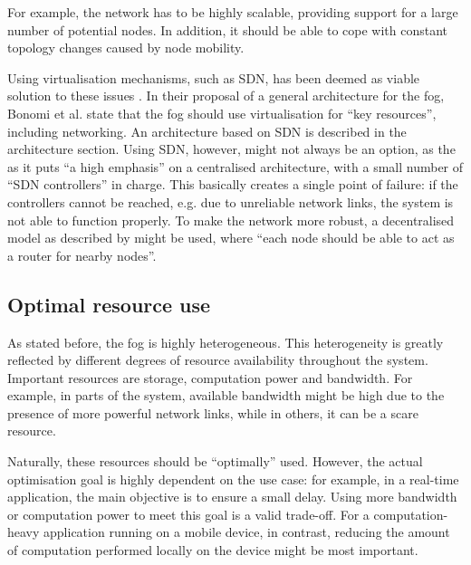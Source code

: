 \documentclass{article}
\begin{document}
For example, the network has to be highly scalable, providing support for a large number of potential nodes. In addition, it should be able to cope with constant topology changes caused by node mobility.

Using virtualisation mechanisms, such as SDN, has been deemed as viable solution to these issues \cite{yi2015survey}. In their proposal of a general architecture for the fog, Bonomi et al. \cite{bonomi2014fog} state that the fog should use virtualisation for ``key resources'', including networking. An architecture based on SDN is described in the architecture section. Using SDN, however, might not always be an option, as the as it puts ``a high emphasis'' \cite{peng2016fog} on a centralised architecture, with a small number of ``SDN controllers'' in charge. This basically creates a single point of failure: if the controllers cannot be reached, e.g. due to unreliable network links, the system is not able to function properly. To make the network more robust, a decentralised model as described by \cite{yi2015survey} might be used, where  ``each node should be able to act as a router for nearby nodes''. 

\subsection{Optimal resource use}
\label{sub_opt_res_use}

As stated before, the fog is highly heterogeneous. This heterogeneity is greatly reflected by different degrees of resource availability throughout the system. Important resources are storage, computation power and bandwidth. For example, in parts of the system, available bandwidth might be high due to the presence of more powerful network links, while in others, it can be a scare resource.

Naturally, these resources should be ``optimally'' used. However, the actual optimisation goal is highly dependent on the use case: for example, in a real-time application, the main objective is to ensure a small delay. Using more bandwidth or computation power to meet this goal is a valid trade-off. For a computation-heavy application running on a mobile device, in contrast, reducing the amount of computation performed locally on the device might be most important.
\end{document}
